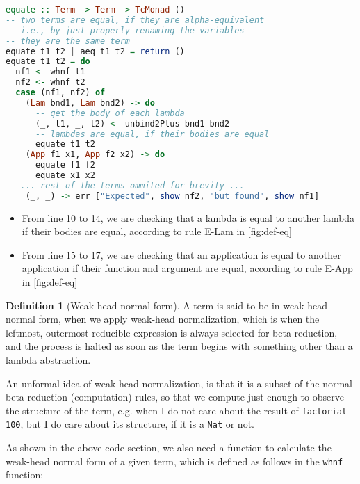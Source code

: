\documentclass[12pt]{article}
\theoremstyle{definition}
\newtheorem{definition}{Definition}[section]
\newcommand{\code}[1]{\texttt{#1}}
\begin{document}
\begin{lstlisting}[language=Haskell]
equate :: Term -> Term -> TcMonad ()
-- two terms are equal, if they are alpha-equivalent
-- i.e., by just properly renaming the variables
-- they are the same term
equate t1 t2 | aeq t1 t2 = return ()
equate t1 t2 = do
  nf1 <- whnf t1
  nf2 <- whnf t2
  case (nf1, nf2) of
    (Lam bnd1, Lam bnd2) -> do
      -- get the body of each lambda
      (_, t1, _, t2) <- unbind2Plus bnd1 bnd2
      -- lambdas are equal, if their bodies are equal
      equate t1 t2
    (App f1 x1, App f2 x2) -> do
      equate f1 f2
      equate x1 x2
-- ... rest of the terms ommited for brevity ...
    (_, _) -> err ["Expected", show nf2, "but found", show nf1]
\end{lstlisting}

\begin{itemize}
       \item From line 10 to 14, we are checking that a lambda is equal to another lambda if their bodies are equal, according to rule E-Lam in \autoref{fig:def-eq}
       \item From line 15 to 17, we are checking that an application is equal to another application if their function and argument are equal, according to rule E-App in \autoref{fig:def-eq}
\end{itemize}

\begin{definition}[Weak-head normal form]
       A term is said to be in weak-head normal form, when we apply weak-head normalization, which is when the leftmost, outermost reducible expression is always selected for beta-reduction, and the process is halted as soon as the term begins with something other than a lambda abstraction.~\cite{advancedtapl}

       An unformal idea of weak-head normalization, is that it is a subset of the normal beta-reduction (computation) rules, so that we compute just enough to observe the structure of the term, e.g. when I do not care about the result of \code{factorial 100}, but I do care about its structure, if it is a \code{Nat} or not.
\end{definition}

As shown in the above code section, we also need a function to calculate the weak-head normal form of a given term, which is defined as follows in the \code{whnf} function:
\end{document}
